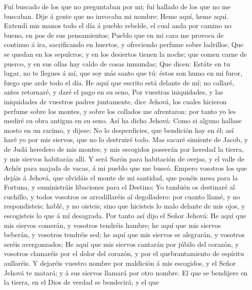  Fuí buscado de los que no preguntaban por mi; fuí hallado
de los que no me buscaban. Dije á gente que no invocaba mi nombre: Heme
aquí, heme aquí.  Extendí mis manos todo el día á pueblo
rebelde, el cual anda por camino no bueno, en pos de sus pensamientos;
 Pueblo que en mi cara me provoca de continuo á ira,
sacrificando en huertos, y ofreciendo perfume sobre ladrillos;
 Que se quedan en los sepulcros, y en los desiertos tienen
la noche; que comen carne de puerco, y en sus ollas hay caldo de cosas
inmundas;  Que dicen: Estáte en tu lugar, no te llegues á
mí, que soy más santo que tú: éstos son humo en mi furor, fuego que arde
todo el día.  He aquí que escrito está delante de mí; no
callaré, antes retornaré, y daré el pago en su seno,  Por
vuestras iniquidades, y las iniquidades de vuestros padres juntamente,
dice Jehová, los cuales hicieron perfume sobre los montes, y sobre los
collados me afrentaron: por tanto yo les mediré su obra antigua en su
seno.  Así ha dicho Jehová: Como si alguno hallase mosto
en un racimo, y dijese: No lo desperdicies, que bendición hay en él; así
haré yo por mis siervos, que no lo destruiré todo.  Mas
sacaré simiente de Jacob, y de Judá heredero de mis montes; y mis
escogidos poseerán por heredad la tierra, y mis siervos habitarán allí.
 Y será Sarón para habitación de ovejas, y el valle de
Achôr para majada de vacas, á mi pueblo que me buscó. 
Empero vosotros los que dejáis á Jehová, que olvidáis el monte de mi
santidad, que ponéis mesa para la Fortuna, y suministráis libaciones
para el Destino;  Yo también os destinaré al cuchillo, y
todos vosotros os arrodillaréis al degolladero: por cuanto llamé, y no
respondisteis; hablé, y no oisteis; sino que hicisteis lo malo delante
de mis ojos, y escogisteis lo que á mí desagrada.  Por
tanto así dijo el Señor Jehová: He aquí que mis siervos comerán, y
vosotros tendréis hambre; he aquí que mis siervos beberán, y vosotros
tendréis sed; he aquí que mis siervos se alegrarán, y vosotros seréis
avergonzados;  He aquí que mis siervos cantarán por
júbilo del corazón, y vosotros clamaréis por el dolor del corazón, y por
el quebrantamiento de espíritu aullaréis.  Y dejaréis
vuestro nombre por maldición á mis escogidos, y el Señor Jehová te
matará; y á sus siervos llamará por otro nombre.  El que
se bendijere en la tierra, en el Dios de verdad se bendecirá; y el que
